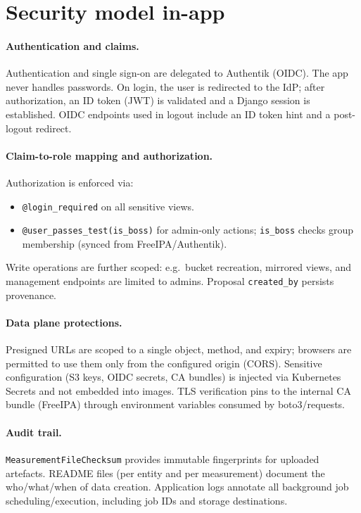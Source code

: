 \section{Security model in-app}\label{sec:security}

\paragraph{Authentication and claims.}
Authentication and single sign-on are delegated to Authentik (OIDC). The app never handles passwords. On login, the user is redirected to the IdP; after authorization, an ID token (JWT) is validated and a Django session is established. OIDC endpoints used in logout include an ID token hint and a post-logout redirect.

\paragraph{Claim-to-role mapping and authorization.}
Authorization is enforced via:
\begin{itemize}
	\item \texttt{@login\_required} on all sensitive views.
	\item \texttt{@user\_passes\_test(is\_boss)} for admin-only actions; \texttt{is\_boss} checks group membership (synced from FreeIPA/Authentik).
\end{itemize}
Write operations are further scoped: e.g.\ bucket recreation, mirrored views, and management endpoints are limited to admins. Proposal \texttt{created\_by} persists provenance.

\paragraph{Data plane protections.}
Presigned URLs are scoped to a single object, method, and expiry; browsers are permitted to use them only from the configured origin (CORS). Sensitive configuration (S3 keys, OIDC secrets, CA bundles) is injected via Kubernetes Secrets and not embedded into images. TLS verification pins to the internal CA bundle (FreeIPA) through environment variables consumed by boto3/requests.

\paragraph{Audit trail.}
\texttt{MeasurementFileChecksum} provides immutable fingerprints for uploaded artefacts. README files (per entity and per measurement) document the who/what/when of data creation. Application logs annotate all background job scheduling/execution, including job IDs and storage destinations.

